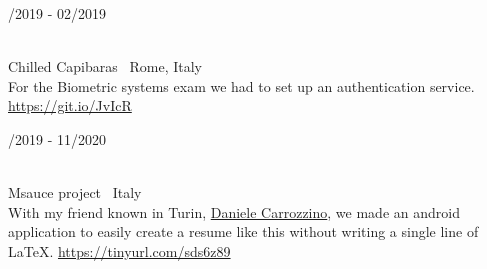 \begin{minipage}{.3\textwidth}
	/2019 - 02/2019 \faCalendar
\end{minipage}
\hfill
\begin{minipage}{.65\textwidth}
	\vfill
	 \\
	\color{Maroon} Chilled Capibaras \color{Sepia} \hfill \faMapMarker \ Rome, Italy
	\smallskip
	\\
	\color{gray} For the Biometric systems exam we had to set up an authentication service. { \color{SkyBlue} \url{https://git.io/JvIcR} \hspace{0.15em} \faGithub}
	\vfill
\end{minipage}

\bigskip

\begin{minipage}{.3\textwidth}
	/2019 - 11/2020 \faCalendar
\end{minipage}
\hfill
\begin{minipage}{.65\textwidth}
	\vfill
	 \\
	\color{Maroon} Msauce project \color{Sepia} \hfill \faMapMarker \ Italy
	\smallskip
	\\
	\color{gray} With my friend known in Turin, \href{https://www.instagram.com/danielecarrozzino}{Daniele Carrozzino}, we made an android application to easily create a resume like this without writing a single line of LaTeX. { \color{SkyBlue} \url{https://tinyurl.com/sds6z89} \hspace{0.15em} \faLink}
	\vfill
\end{minipage}

\bigskip